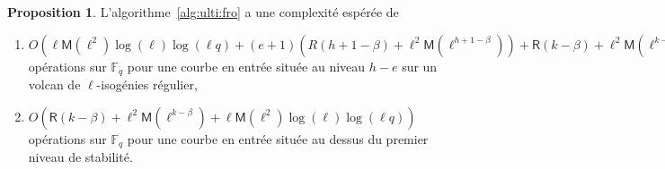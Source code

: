\documentclass[10pt,a4paper]{book}
\theoremstyle{plain}
\theoremstyle{definition}
\theoremstyle{definition}
\theoremstyle{definition}
\newtheorem{prop}[thm]{Proposition}
\theoremstyle{definition}
\theoremstyle{remark}
\theoremstyle{remark}
\theoremstyle{definition}
\begin{document}
\begin{prop}
\label{pro:alg:ulti}
L'algorithme~\ref{alg:ulti:fro} a une complexité espérée de
\begin{enumerate}
\item 
 $O(\ell\mathsf{M}(\ell^2)\log(\ell)\log(\ell q)+(e+1)(R(h+1-\beta)+\ell^2 \mathsf{M}(\ell^{h+1-\beta}))+\mathsf{R}(k-\beta) + \ell^2\mathsf{M}(\ell^{k-\beta}))$ opérations sur $\mathbb{F}_q$ pour une courbe en entrée située au niveau $h-e$ sur un volcan de $\ell$-isogénies régulier,  
\item  $O(\mathsf{R}(k-\beta) + \ell^2\mathsf{M}(\ell^{k-\beta}) + \ell\mathsf{M}(\ell^2)\log(\ell)\log(\ell q))$ opérations sur $\mathbb{F}_q$ pour une courbe en entrée située au dessus du premier niveau de stabilité.
\end{enumerate}
\end{prop}
\end{document}
